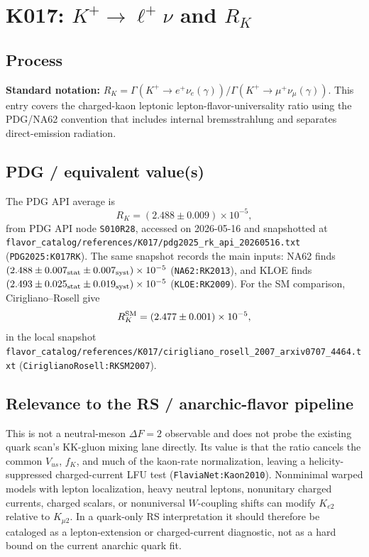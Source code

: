 
\section{K017: \(K^+ \to \ell^+ \nu\) and \(R_K\)}

\subsection*{Process}
\textbf{Standard notation:} \(R_K =
\Gamma(K^+\to e^+\nu_e(\gamma))/\Gamma(K^+\to\mu^+\nu_\mu(\gamma))\).
This entry covers the charged-kaon leptonic lepton-flavor-universality ratio
using the PDG/NA62 convention that includes internal bremsstrahlung and
separates direct-emission radiation.

\subsection*{PDG / equivalent value(s)}
The PDG API average is
\[
  R_K = (2.488\pm0.009)\times10^{-5},
\]
from PDG API node \texttt{S010R28}, accessed on 2026-05-16 and snapshotted at
\texttt{flavor\_catalog/references/K017/pdg2025\_rk\_api\_20260516.txt}
(\texttt{PDG2025:K017RK}).  The same snapshot records the main inputs: NA62
finds
\((2.488\pm0.007_{\rm stat}\pm0.007_{\rm syst})\times10^{-5}\)
(\texttt{NA62:RK2013}), and KLOE finds
\((2.493\pm0.025_{\rm stat}\pm0.019_{\rm syst})\times10^{-5}\)
(\texttt{KLOE:RK2009}).  For the SM comparison, Cirigliano--Rosell give
\[
  R_K^{\rm SM}=(2.477\pm0.001)\times10^{-5},
\]
in the local snapshot
\texttt{flavor\_catalog/references/K017/cirigliano\_rosell\_2007\_arxiv0707\_4464.txt}
(\texttt{CiriglianoRosell:RKSM2007}).

\subsection*{Relevance to the RS / anarchic-flavor pipeline}
This is not a neutral-meson \(\Delta F=2\) observable and does not probe the
existing quark scan's KK-gluon mixing lane directly.  Its value is that the
ratio cancels the common \(V_{us}\), \(f_K\), and much of the kaon-rate
normalization, leaving a helicity-suppressed charged-current LFU test
(\texttt{FlaviaNet:Kaon2010}).
Nonminimal warped models with lepton localization, heavy neutral leptons,
nonunitary charged currents, charged scalars, or nonuniversal \(W\)-coupling
shifts can modify \(K_{e2}\) relative to \(K_{\mu2}\).  In a quark-only RS
interpretation it should therefore be cataloged as a lepton-extension or
charged-current diagnostic, not as a hard bound on the current anarchic
quark fit.

